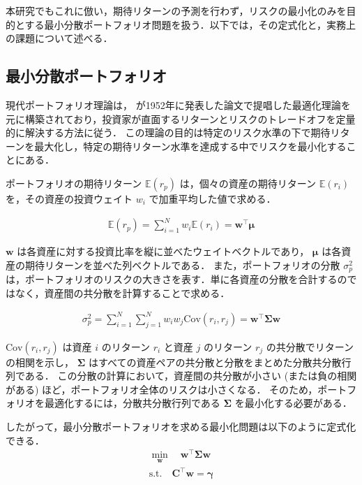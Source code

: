 \documentclass[lualatex,a4paper,11pt]{jlreq}
\begin{document}
本研究でもこれに倣い，期待リターンの予測を行わず，リスクの最小化のみを目的とする最小分散ポートフォリオ問題を扱う．以下では，その定式化と，実務上の課題について述べる．


\subsection{最小分散ポートフォリオ}

現代ポートフォリオ理論は，\citet{Markowitz1952} が1952年に発表した論文で提唱した最適化理論を元に構築されており，投資家が直面するリターンとリスクのトレードオフを定量的に解決する方法に従う．
この理論の目的は特定のリスク水準の下で期待リターンを最大化し，特定の期待リターン水準を達成する中でリスクを最小化することにある．

ポートフォリオの期待リターン $\mathbb{E}(r_p)$ は，個々の資産の期待リターン $\mathbb{E}(r_i)$ を，その資産の投資ウェイト $w_i$ で加重平均した値で求める．

\begin{align}
    \mathbb{E}(r_p) = \sum_{i=1}^{N} w_i \mathbb{E}(r_i) = \symbf{w}^\top \symbf{\mu}
\end{align}

$\symbf{w}$ は各資産に対する投資比率を縦に並べたウェイトベクトルであり， $\symbf{\mu}$ は各資産の期待リターンを並べた列ベクトルである．
また，ポートフォリオの分散 $\sigma^2_p$ は，ポートフォリオのリスクの大きさを表す．単に各資産の分散を合計するのではなく，資産間の共分散を計算することで求める．

\begin{align}
  \sigma^2_p = \sum_{i=1}^{N} \sum_{j=1}^{N} w_i w_j \text{Cov}(r_i, r_j) = \symbf{w}^\top \symbf{\Sigma} \symbf{w}
\end{align}

$\text{Cov}(r_i, r_j)$ は資産 $i$ のリターン $r_i$ と資産 $j$ のリターン $r_j$ の共分散でリターンの相関を示し， $\symbf{\Sigma}$ はすべての資産ペアの共分散と分散をまとめた分散共分散行列である．
この分散の計算において，資産間の共分散が小さい (または負の相関がある) ほど，ポートフォリオ全体のリスクは小さくなる．
そのため，ポートフォリオを最適化するには，分散共分散行列である $\symbf{\Sigma}$ を最小化する必要がある．

したがって，最小分散ポートフォリオを求める最小化問題は以下のように定式化できる．
\begin{align}
  \min_{\symbf{w}} \quad \symbf{w}^\top \symbf{\Sigma} \symbf{w}
  \\[1em]
  \text{s.t.} \quad \symbf{C}^\top\symbf{w} = \symbf{\gamma}
\end{align}
\end{document}
